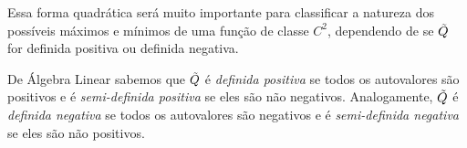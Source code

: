 Essa forma quadrática será muito importante para classificar a natureza dos possíveis máximos e mínimos de uma função de classe $C^2$, dependendo de se $\Tilde{Q}$ for definida positiva ou definida negativa. 

\begin{remark}{}{}
De Álgebra Linear sabemos que $\Tilde{Q}$ é \textit{definida positiva} se todos os autovalores são positivos e é \textit{semi-definida positiva} se eles são não negativos. Analogamente, $\Tilde{Q}$ é \textit{definida negativa} se todos os autovalores são negativos e é \textit{semi-definida negativa} se eles são não positivos.
\end{remark}